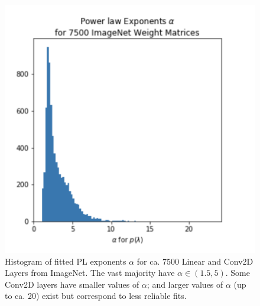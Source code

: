 \begin{figure}[t] %
   \centering
   \includegraphics[scale=0.40]{img/power-law-histogram.png} 
   \caption{Histogram of fitted PL exponents $\alpha$ for ca. 7500 Linear and Conv2D Layers from ImageNet.  The vast majority have $\alpha\in(1.5,5)$.  Some Conv2D layers have smaller values of $\alpha$; and larger values of $\alpha$ (up to ca. 20) exist but correspond to less reliable fits.  }
   \label{fig:power-law-histogram}
\end{figure}


